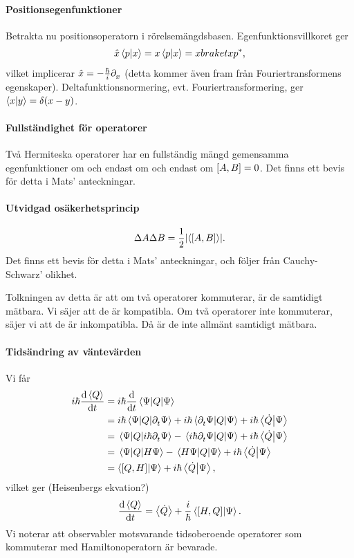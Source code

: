 \paragraph{Positionsegenfunktioner}
Betrakta nu positionsoperatorn i rörelsemängdsbasen. Egenfunktionsvillkoret ger
\begin{align*}
	\hat{x}\braket{p}{x} = x\braket{p}{x} = xbraket{x}{p}^{*},
\end{align*}
vilket implicerar $\hat{x} = -\frac{\hbar}{i}\partial_{x}^{}$ (detta kommer även fram från Fouriertransformens egenskaper). Deltafunktionsnormering, evt. Fouriertransformering, ger $\braket{x}{y} = \delta(x - y)$.

\paragraph{Fullständighet för operatorer}
Två Hermiteska operatorer har en fullständig mängd gemensamma egenfunktioner om och endast om och endast om $[A, B] = 0$. Det finns ett bevis för detta i Mats' anteckningar.

\paragraph{Utvidgad osäkerhetsprincip}
\begin{align*}
	\Delta A\Delta B = \frac{1}{2}\abs{\expval{[A, B]}}.
\end{align*}
Det finns ett bevis för detta i Mats' anteckningar, och följer från Cauchy-Schwarz' olikhet.

Tolkningen av detta är att om två operatorer kommuterar, är de samtidigt mätbara. Vi säjer att de är kompatibla. Om två operatorer inte kommuterar, säjer vi att de är inkompatibla. Då är de inte allmänt samtidigt mätbara.

\paragraph{Tidsändring av väntevärden}
Vi får
\begin{align*}
	i\hbar\dv{\expval{Q}}{t} &= i\hbar\dv{t}\expval{Q}{\Psi} \\
	                         &= i\hbar\mel{\Psi}{Q}{\partial_{t}^{}\Psi} + i\hbar\mel{\partial_{t}^{}\Psi}{Q}{\Psi} + i\hbar\braket{\dot{Q}}{\Psi} \\
	                         &= \mel{\Psi}{Q}{i\hbar\partial_{t}^{}\Psi} - \mel{i\hbar\partial_{t}^{}\Psi}{Q}{\Psi} + i\hbar\braket{\dot{Q}}{\Psi} \\
	                         &= \mel{\Psi}{Q}{H\Psi} - \mel{H\Psi}{Q}{\Psi} + i\hbar\braket{\dot{Q}}{\Psi} \\
	                         &= \braket{[Q, H]}{\Psi} + i\hbar\braket{\dot{Q}}{\Psi},
\end{align*}
vilket ger (Heisenbergs ekvation?)
\begin{align*}
	\dv{\expval{Q}}{t} = \expval{\dot{Q}} + \frac{i}{\hbar}\braket{[H, Q]}{\Psi}.
\end{align*}
Vi noterar att observabler motsvarande tidsoberoende operatorer som kommuterar med Hamiltonoperatorn är bevarade.

